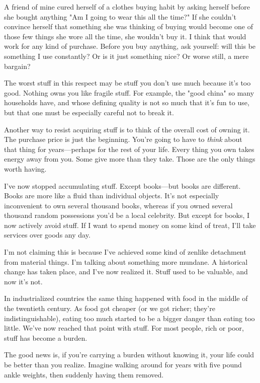 A friend of mine cured herself of a clothes buying habit by asking
herself before she bought anything "Am I going to wear this all the
time?"  If she couldn't convince herself that something she was
thinking of buying would become one of those few things she wore
all the time, she wouldn't buy it.  I think that would work for any
kind of purchase.  Before you buy anything, ask yourself: will this
be something I use constantly?  Or is it just something nice?  Or
worse still, a mere bargain?

The worst stuff in this respect may be stuff you don't use much
because it's too good.  Nothing owns you like fragile stuff.  For
example, the "good china" so many households have, and whose defining
quality is not so much that it's fun to use, but that one must be
especially careful not to break it.

Another way to resist acquiring stuff is to think of the overall
cost of owning it.  The purchase price is just the beginning.  You're
going to have to \emph{think} about that thing for years---perhaps for
the rest of your life.  Every thing you own takes energy away from
you.  Some give more than they take.  Those are the only things
worth having.

I've now stopped accumulating stuff.  Except books---but books are
different.  Books are more like a fluid than individual objects.
It's not especially inconvenient to own several thousand books,
whereas if you owned several thousand random possessions you'd be
a local celebrity.  But except for books, I now actively avoid
stuff.  If I want to spend money on some kind of treat, I'll take
services over 
goods any day.

I'm not claiming this is because I've achieved some kind of zenlike
detachment from material things.  I'm talking about something more
mundane.  A historical change has taken place, and I've now realized
it.  Stuff used to be valuable, and now it's not.

In industrialized countries the same thing happened with food in
the middle of the twentieth century.  As food got cheaper (or we
got richer; they're indistinguishable), eating too much started to
be a bigger danger than eating too little.   We've now reached that
point with stuff.  For most people, rich or poor, stuff has become
a burden.

The good news is, if you're carrying a burden without knowing it,
your life could be better than you realize.  Imagine walking around
for years with five pound ankle weights, then suddenly having them
removed.









